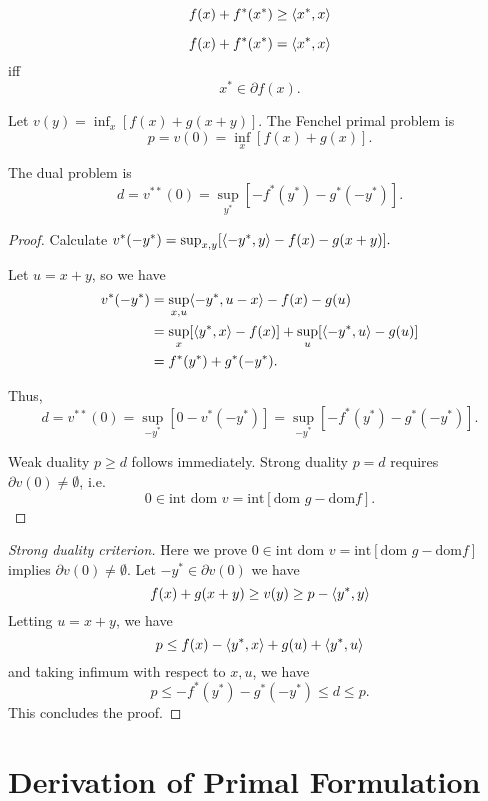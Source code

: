 \begin{theorem}
	$$f(x)+f^{*}(x^{*})\geq \ang*{x^{*},x}$$
\end{theorem}

\begin{corollary}
	$$f(x)+f^{*}(x^{*})= \ang*{x^{*},x}$$ iff
	$$x^{*}\in \partial f(x).$$
\end{corollary}

\begin{theorem}
	Let $v(y) = \inf_x [f(x)+g(x+y)].$ The Fenchel primal problem is
	$$p = v(0) = \inf_x [f(x)+g(x)].$$
	
	The dual problem is
	$$d = v^{**}(0)=\sup_{y^{*}} [-f^{*}(y^{*})-g^{*}(-y^{*})].$$
\end{theorem}

\begin{proof}
	Calculate $v^{*}(-y^{*}) = \sup_{x,y}[\ang*{-y^{*},y}-f(x)-g(x+y)].$
	
	Let $u = x+y$, so we have
	\begin{align*}
	v^{*}(-y^{*}) &= \sup_{x,u} \ang*{-y^{*},u-x} - f(x) - g(u) \\
	&= \sup_x [\ang*{y^{*},x}-f(x)]+\sup_u [\ang*{-y^{*},u}-g(u)] \\
	&= f^{*}(y^{*}) + g^{*}(-y^{*}).
	\end{align*}
	
	Thus,
	$$d = v^{**}(0) = \sup_{-y^{*}}[0 - v^{*}(-y^{*})] = \sup_{-y^{*}}[-f^{*}(y^{*})-g^{*}(-y^{*})].$$
	
	Weak duality $p\geq d$ follows immediately. Strong duality $p=d$ requires $\partial v(0)\neq \emptyset$, i.e.
	$$0\in \textrm{int dom }v = \textrm{int}[\textrm{dom } g-\textrm{dom} f].$$
\end{proof}

\begin{proof}[Strong duality criterion]
	Here we prove $0\in \textrm{int dom }v = \textrm{int}[\textrm{dom } g-\textrm{dom} f]$ implies $\partial v(0)\neq \emptyset$. Let $-y^{*}\in \partial v(0)$ we have
	$$
	f(x)+g(x+y)\geq v(y)\geq p-\ang*{y^{*},y}
	$$
	Letting $u=x+y$, we have
	$$p\leq f(x)-\ang*{y^{*},x}+g(u)+\ang*{y^{*},u}
	$$ and taking infimum with respect to $x,u$, we have
	$$
	p\leq -f^{*}(y^{*})-g^{*}(-y^{*})\leq d\leq p.
	$$
	This concludes the proof.
\end{proof}

\section{Derivation of Primal Formulation}

